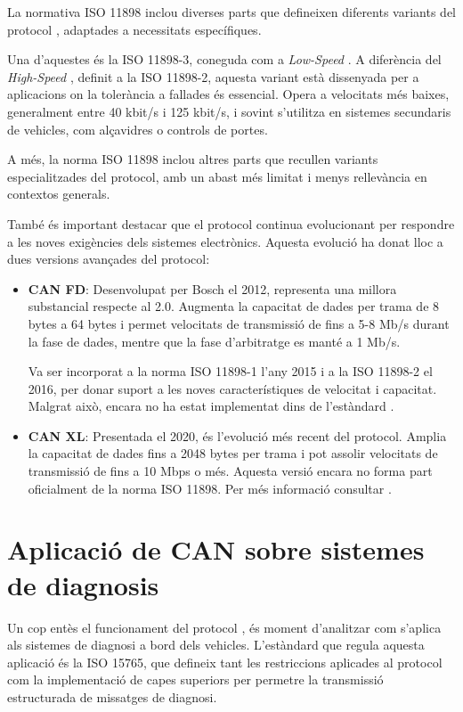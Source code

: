 \documentclass{tfgitic}[2024/07/01]
\begin{document}
La normativa ISO 11898 inclou diverses parts que defineixen diferents variants del protocol , adaptades a necessitats específiques.

Una d'aquestes és la ISO 11898-3, coneguda com a \textit{Low-Speed} . A diferència del \textit{High-Speed } , definit a la 
ISO 11898-2, aquesta variant està dissenyada per a aplicacions on la tolerància a fallades és essencial. Opera a velocitats més baixes, 
generalment entre 40 kbit/s i 125 kbit/s, i sovint s'utilitza en sistemes secundaris de vehicles, com alçavidres o controls de portes.

A més, la norma ISO 11898 inclou altres parts que recullen variants especialitzades del protocol, amb un abast més limitat i menys 
rellevància en contextos generals.

També és important destacar que el protocol  continua evolucionant per respondre a les noves exigències dels sistemes electrònics. 
Aquesta evolució ha donat lloc a dues versions avançades del protocol:

\begin{itemize}
  \item \textbf{CAN FD}: Desenvolupat per Bosch el 2012, representa una millora substancial respecte al  2.0. Augmenta la capacitat de dades 
  per trama de 8 bytes a 64 bytes i permet velocitats de transmissió de fins a 5-8 Mb/s durant la fase de dades, mentre que la fase d'arbitratge 
  es manté a 1 Mb/s.
 
  Va ser incorporat a la norma ISO 11898-1 l'any 2015 i a la ISO 11898-2 el 2016, per donar suport a les noves característiques de velocitat i capacitat. 
  Malgrat això, encara no ha estat implementat dins de l'estàndard .
  
  \item \textbf{CAN XL}: Presentada el 2020, és l'evolució més recent del protocol. Amplia la capacitat de dades fins a 2048 bytes per trama i 
  pot assolir velocitats de transmissió de fins a 10 Mbps o més. Aquesta versió encara no forma part oficialment de la norma ISO 11898. Per més informació consultar \cite{can_cia_xl}.
\end{itemize} 

\section{Aplicació de CAN sobre sistemes de diagnosis}

Un cop entès el funcionament del protocol , és moment d'analitzar com s'aplica als sistemes de diagnosi a bord dels vehicles. 
L'estàndard que regula aquesta aplicació és la ISO 15765, que defineix tant les restriccions aplicades al protocol  com la implementació 
de capes superiors per permetre la transmissió estructurada de missatges de diagnosi.
\end{document}
